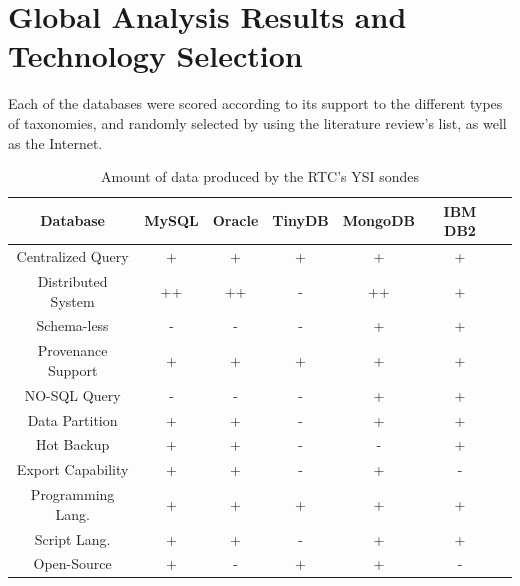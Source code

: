 \section{Global Analysis Results and Technology Selection}

Each of the databases were scored according to its support to the different
types of taxonomies, and randomly selected by using the literature review's
list, as well as the Internet.

\begin{table}
    \label{tab:ysi-data-distribution}
    \caption{Amount of data produced by the RTC's YSI sondes}
        \begin{center}
        \begin{tabular}{|c|c|c|c|c|c|c|}\hline 
        \textbf{Database} & \textbf{MySQL} & \textbf{Oracle} &
        \textbf{TinyDB} & \textbf{MongoDB} & \textbf{IBM DB2}\\\hline 
        Centralized Query & + & + & + & + & + \\\hline 
        Distributed System & ++ & ++ & - & ++ & +\\\hline 
        Schema-less & - & - & - & + & +\\\hline 
        Provenance Support & + & + & + & + & +\\\hline 
        NO-SQL Query & - & - & - & + & +\\\hline 
        Data Partition & + & + & - & + & +\\\hline 
        Hot Backup & + & + & - & - & +\\\hline 
        Export Capability & + & + & - & + & -\\\hline 
        Programming Lang. & + & + & + & + & +\\\hline
        Script Lang. & + & + & - & + & +\\\hline
        Open-Source & + & - & + & + & -\\\hline
        \end{tabular}
        \end{center}
\end{table}

